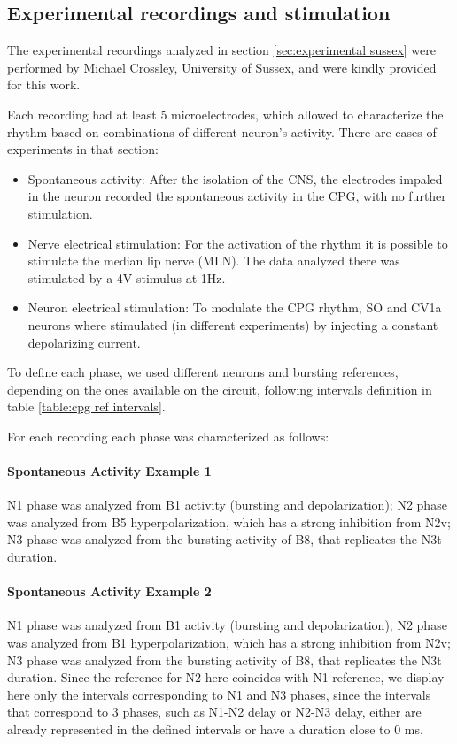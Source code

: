 \subsection{Experimental recordings and stimulation}
\label{subsec:methods experimental intervals}
The experimental recordings analyzed in section \ref{sec:experimental sussex} were performed by Michael Crossley, University of Sussex, and were kindly provided for this work. 

Each recording had at least 5 microelectrodes, which allowed to characterize the rhythm based on combinations of different neuron's activity. There are cases of experiments in that section:
\begin{itemize}
	\item Spontaneous activity: After the isolation of the CNS, the electrodes impaled in the neuron recorded the spontaneous activity in the CPG, with no further stimulation.
	\item Nerve electrical stimulation: For the activation of the rhythm it is possible to stimulate the median lip nerve (MLN). The data analyzed there was stimulated by a 4V stimulus at 1Hz. 
	\item Neuron electrical stimulation: To modulate the CPG rhythm, SO and CV1a neurons where stimulated (in different experiments) by injecting a constant depolarizing current.
\end{itemize}

To define each phase, we used different neurons and bursting references, depending on the ones available on the circuit, following intervals definition in table \ref{table:cpg ref intervals}.

For each recording each phase was characterized as follows:

\paragraph{Spontaneous Activity Example 1}
N1 phase was analyzed from B1 activity (bursting and depolarization); N2 phase was analyzed from B5 hyperpolarization, which has a strong inhibition from N2v; N3 phase was analyzed from the bursting activity of B8, that replicates the N3t duration. 

\paragraph{Spontaneous Activity Example 2}
N1 phase was analyzed from B1 activity (bursting and depolarization); N2 phase was analyzed from B1 hyperpolarization, which has a strong inhibition from N2v; N3 phase was analyzed from the bursting activity of B8, that replicates the N3t duration. 
Since the reference for N2 here coincides with N1 reference, we display here only the intervals corresponding to N1 and N3 phases, since the intervals that correspond to 3 phases, such as N1-N2 delay or N2-N3 delay, either are already represented in the defined intervals or have a duration close to 0 ms.

